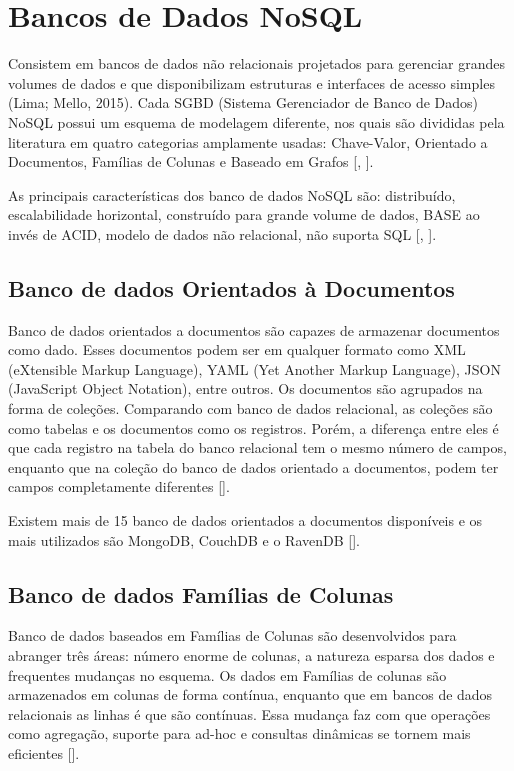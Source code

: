 \clearpage


\section{Bancos de Dados NoSQL}

Consistem em bancos de dados não relacionais projetados para gerenciar grandes volumes de dados e que disponibilizam estruturas e interfaces de acesso simples (Lima; Mello, 2015). Cada SGBD (Sistema Gerenciador de Banco de Dados) NoSQL possui um esquema de modelagem diferente, nos quais são divididas pela literatura em quatro categorias amplamente usadas: Chave-Valor, Orientado a Documentos, Famílias de Colunas e Baseado em Grafos [\cite{fowler:2013}, \cite{kaur:2013}].

As principais características dos banco de dados NoSQL são: distribuído, escalabilidade horizontal, construído para grande volume de dados, BASE ao invés de ACID, modelo de dados não relacional, não suporta SQL [\cite{fowler:2013}, \cite{nasholm:2012}].

\subsection{Banco de dados Orientados à Documentos}

Banco de dados orientados a documentos são capazes de armazenar documentos como dado. Esses documentos podem ser em qualquer formato como XML (eXtensible Markup Language), YAML (Yet Another Markup Language), JSON (JavaScript Object Notation), entre outros. Os documentos são agrupados na forma de coleções. Comparando com banco de dados relacional, as coleções são como tabelas e os documentos como os registros. Porém, a diferença entre eles é que cada registro na tabela do banco relacional tem o mesmo número de campos, enquanto que na coleção do banco de dados orientado a documentos, podem ter campos completamente diferentes [\cite{kaur:2013}].

Existem mais de 15 banco de dados orientados a documentos disponíveis e os mais utilizados são MongoDB, CouchDB e o RavenDB [\cite{kaur:2013}].

\subsection{Banco de dados Famílias de Colunas}

Banco de dados baseados em Famílias de Colunas são desenvolvidos para abranger três áreas: número enorme de colunas, a natureza esparsa dos dados e frequentes mudanças no esquema. Os dados em Famílias de colunas são armazenados em colunas de forma contínua, enquanto que em bancos de dados relacionais as linhas é que são contínuas. Essa mudança faz com que operações como agregação, suporte para ad-hoc e consultas dinâmicas se tornem mais eficientes [\cite{kaur:2013}].

